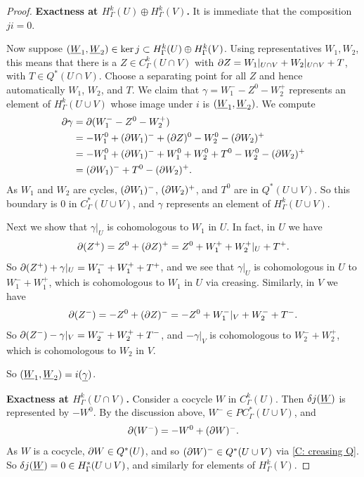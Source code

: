 \begin{proof}
	\textbf{Exactness at $H^k_\Gamma(U) \oplus H^k_\Gamma(V)$.}
	It is immediate that the composition $ji = 0$.

	Now suppose $(\underline{W}_1,\underline{W}_2) \in \ker j \subset H^k_\Gamma(U) \oplus H^k_\Gamma(V)$. Using representatives $W_1,W_2$, this means that there is a $Z \in C^k_\Gamma(U \cap V)$ with $\partial Z = W_1|_{U \cap V}+W_2|_{U \cap V}+T$, with $T \in Q^*(U \cap V)$. Choose a separating point for all $Z$ and hence automatically $W_1$, $W_2$, and $T$. We claim that $\gamma = W_1^- - Z^0 -W_2^+$ represents an element of $H^k_\Gamma(U \cup V)$ whose image under $i$ is $(\underline{W}_1,\underline{W}_2)$.
	We compute
	\begin{align*}\partial \gamma& = \partial (W_1^- - Z^0 -W_2^+)\\
		& = -W_1^0 +(\partial W_1)^- + (\partial Z)^0 - W_2^0 - (\partial W_2)^+\\
		& = -W_1^0 +(\partial W_1)^- + W_1^0+W_2^0+T^0 - W_2^0 - (\partial W_2)^+\\
		& = (\partial W_1)^- +T^0 - (\partial W_2)^+.
	\end{align*}
	As $W_1$ and $W_2$ are cycles, $(\partial W_1)^-$, $(\partial W_2)^+$, and $T^0$ are in $Q^*(U \cup V)$. So this boundary is $0$ in $C^*_\Gamma(U \cup V)$, and $\gamma$ represents an element of $H^k_\Gamma(U \cup V)$.

	Next we show that $\gamma|_U$ is cohomologous to $W_1$ in $U$. In fact, in $U$ we have
	$$\partial (Z^+) = Z^0+(\partial Z)^+ = Z^0+ W_1^++ W_2^+|_{U}+T^+.$$ So
	$\partial (Z^+) +\gamma|_U = W_1^-+W_1^+ +T^+$, and we see that $\gamma|_U$ is cohomologous in $U$ to $W_1^-+W_1^+$, which is cohomologous to $W_1$ in $U$ via creasing. Similarly, in $V$ we have
	$$\partial (Z^-) = -Z^0+(\partial Z)^- = -Z^0+W_1^-|_{V}+ W_2^-+T^-.$$
	So
	$\partial(Z^-) - \gamma|_V = W_2^-+W_2^+ +T^-$, and $-\gamma|_V$ is cohomologous to $W_2^-+W_2^+$, which is cohomologous to $W_2$ in $V$.

	So $(\underline{W}_1,\underline{W}_2) = i(\underline{\gamma})$.

	\textbf{Exactness at $H^k_\Gamma(U \cap V)$.}
	Consider a cocycle $W$ in $C^k_\Gamma(U)$. Then $\delta j(\underline{W})$ is represented by $-W^0$. By the discussion above, $W^- \in PC^*_\Gamma(U \cup V)$, and $$\partial (W^-) = -W^0+ (\partial W)^-.$$ As $W$ is a cocycle, $\partial W \in Q^*(U)$, and so $(\partial W)^- \in Q^*(U \cup V)$ via \cref{C: creasing Q}. So $\delta j(\underline{W}) = 0 \in H^*_\Gamma(U \cup V)$, and similarly for elements of $H^k_\Gamma(V)$.


\end{proof}
